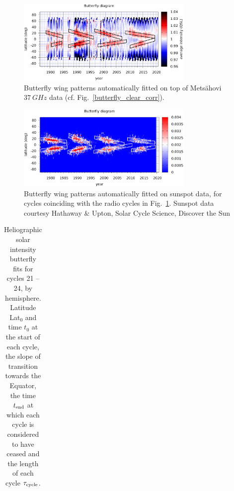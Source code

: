 \documentclass{aa}
\begin{document}
\begin{figure}
\centering
\includegraphics[width=8.5cm]{butterfly_wingfit_raw.png}
\caption{Butterfly wing patterns automatically fitted on top of Mets\"ahovi $\SI{37}{GHz}$ data (cf. Fig.~\ref{butterfly_clear_corr}).} 
\label{butterfly_wingfit_raw}
\end{figure}

\begin{figure}
\centering
\includegraphics[width=8.5cm]{butterfly_wingfit_sunspot.png}
\caption{Butterfly wing patterns automatically fitted on sunspot data, for
cycles coinciding with the radio cycles in Fig.~\ref{butterfly_wingfit_raw}.
Sunspot data courtesy Hathaway \& Upton, Solar Cycle Science,
Discover the Sun}
\label{butterfly_wingfit_sunspot}
\end{figure}

\begin{table}
\caption{\label{tab:cycles}
Heliographic solar intensity butterfly fits for cycles 21 -- 24, by hemisphere.
Latitude Lat$_0$ and time $t_0$ at the start of each cycle, the slope of transition
towards the Equator, the time $t_{\rm end}$ at which each cycle is considered to have
ceased and the length of each cycle $\tau_{\rm cycle}$.
}
\begin{tabular}{l|ccccr}
\hline\hline

\hline
\end{tabular}
\end{table}
\end{document}
